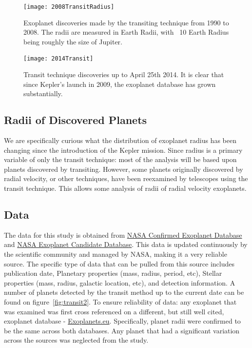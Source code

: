 \documentclass[
10pt, %
a4paper, %
oneside, %
headinclude,footinclude, %
BCOR5mm, %
]{scrartcl}
\begin{document}
\begin{figure}[tb]
\centering 
\texttt{[image: 2008TransitRadius]} 
\caption[>2008 Exoplanet transit discoveries]{Exoplanet discoveries made by the transiting technique from 1990 to 2008. The radii are measured in Earth Radii, with ~10 Earth Radius being roughly the size of Jupiter.}
\label{fig:transit2} 
\end{figure}
\begin{figure}[tb]
\centering 
\texttt{[image: 2014Transit]} 
\caption[Current Transit Technique Discoveries]{Transit technique discoveries up to April 25th 2014. It is clear that since Kepler's launch in 2009, the exoplanet database has grown substantially.}
\label{fig:transit2} 
\end{figure}
\subsection{Radii of Discovered Planets}
We are specifically curious what the distribution of exoplanet radius has been changing since the introduction of the Kepler mission. Since radius is a primary variable of only the transit technique: most of the analysis will be based upon planets discovered by transiting. However, some planets originally discovered by radial velocity, or other techniques, have been reexamined by telescopes using the transit technique. This allows some analysis of radii of radial velocity exoplanets. 


 
\subsection{Data}
The data for this study is obtained from \href{"http://exoplanetarchive.ipac.caltech.edu/cgi-bin/ExoTables/nph-exotbls?dataset=planets"}{NASA Confirmed Exoplanet Database} and 
\href{"http://exoplanetarchive.ipac.caltech.edu/cgi-bin/ExoTables/nph-exotbls?dataset=cumulative"}{NASA Exoplanet Candidate Database}. This data is updated continuously by the scientific community and managed by NASA, making it a very reliable source. The specific type of data that can be pulled from this source includes publication date, Planetary properties (mass, radius, period, etc), Stellar properties (mass, radius, galactic location, etc), and detection information. A number of planets detected by the transit method up to the current date can be found on figure~\vref{fig:transit2}. To ensure reliability of data: any exoplanet that was examined was first cross referenced on a different, but still well cited, exoplanet database - \href{"http://exoplanets.eu/"}{Exoplanets.eu}. Specifically, planet radii were confirmed to be the same across both databases. Any planet that had a significant variation across the sources was neglected from the study. 
\end{document}
